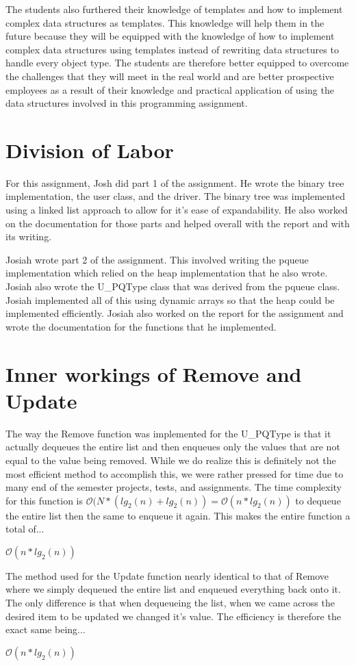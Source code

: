 \documentclass[pdftex, 12pt]{article}
\begin{document}
The students also furthered their knowledge of templates and how to implement complex data structures as templates. This
knowledge will help them in the future because they will be equipped with the knowledge of how to implement complex data
structures using templates instead of rewriting data structures to handle every object type. The students are therefore
better equipped to overcome the challenges that they will meet in the real world and are better prospective employees as
a result of their knowledge and practical application of using the data structures involved in this programming
assignment.

\section{Division of Labor}

For this assignment, Josh did part 1 of the assignment. He wrote the binary tree implementation, the user class, and the
driver. The binary tree was implemented using a linked list approach to allow for it's ease of expandability. He also
worked on the documentation for those parts and helped overall with the report and with its writing.

Josiah wrote part 2 of the assignment. This involved writing the pqueue implementation which relied on the heap
implementation that he also wrote. Josiah also wrote the U\_PQType class that was derived from the pqueue class. Josiah
implemented all of this using dynamic arrays so that the heap could be implemented efficiently. Josiah also worked on
the report for the assignment and wrote the documentation for the functions that he implemented. 

\section{Inner workings of Remove and Update}

The way the Remove function was implemented for the U\_PQType is that it actually dequeues the entire list and then
enqueues only the values that are not equal to the value being removed.  While we do realize this is definitely not the
most efficient method to accomplish this, we were rather pressed for time due to many end of the semester projects,
tests, and assignments.  The time complexity for this function is $\mathcal{O}(N*(lg_2(n)+lg_2(n))=\mathcal{O}(n*lg_2(n))$ to dequeue the entire
list then the same to enqueue it again. This makes the entire function a total of...

$\mathcal{O}(n*lg_2(n))$

The method used for the Update function nearly identical to that of Remove where we simply dequeued the entire list and
enqueued everything back onto it.  The only difference is that when dequeueing the list, when we came across the desired
item to be updated we changed it's value.  The efficiency is therefore the exact same being...

$\mathcal{O}(n*lg_2(n))$
\end{document}
